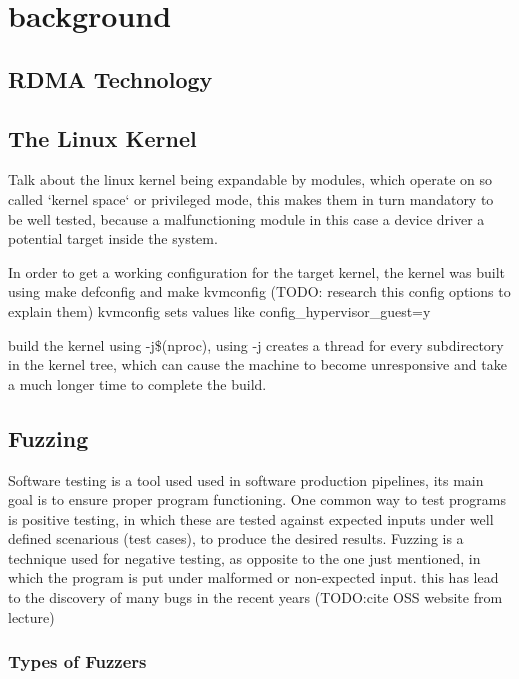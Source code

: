 \section{background}



\subsection{RDMA Technology}


\subsection{The Linux Kernel}

Talk about the linux kernel being expandable by modules, which operate on
so called `kernel space` or privileged mode, this makes them in turn mandatory
to be well tested, because  a malfunctioning module in this case a device 
driver a potential target inside the system.

In order to get a working configuration for the target kernel, the kernel was built using make defconfig and make kvmconfig (TODO: research this config options to explain them)
kvmconfig sets values like config\_hypervisor\_guest=y

build the kernel using -j\$(nproc), using -j creates a thread for every subdirectory in the kernel tree, which can cause the machine to become unresponsive and take a much
longer time to complete the build. \cite{kroah-hartman06}

\subsection{Fuzzing}

Software testing is a tool used used in software production pipelines, its main goal is to ensure proper program functioning. One common way to test programs is 
positive testing, in which these are tested against expected inputs under well defined scenarious (test cases), to produce the desired results.
Fuzzing is a technique used for negative testing, as opposite to the one just mentioned, in which the program is put under malformed or non-expected input. this
has lead to the discovery of many bugs in the recent years (TODO:\@ cite OSS website from lecture)


\subsubsection{Types of Fuzzers}
 
